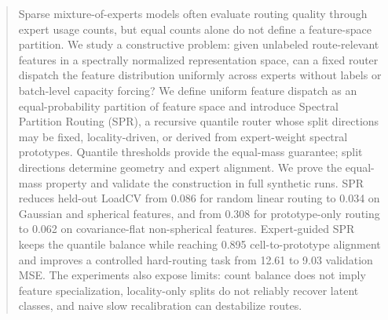 \begin{abstract}
Sparse mixture-of-experts models often evaluate routing quality through expert
usage counts, but equal counts alone do not define a feature-space partition. We
study a constructive problem: given unlabeled route-relevant features in a
spectrally normalized representation space, can a fixed router dispatch the
feature distribution uniformly across experts without labels or batch-level
capacity forcing? We define uniform feature dispatch as an equal-probability
partition of feature space and introduce Spectral Partition Routing (SPR), a
recursive quantile router whose split directions may be fixed, locality-driven,
or derived from expert-weight spectral prototypes. Quantile thresholds provide
the equal-mass guarantee; split directions determine geometry and expert
alignment. We prove the equal-mass property and validate the construction in
full synthetic runs. SPR reduces held-out LoadCV from 0.086 for random linear
routing to 0.034 on Gaussian and spherical features, and from 0.308 for
prototype-only routing to 0.062 on covariance-flat non-spherical features.
Expert-guided SPR keeps the quantile balance while reaching 0.895
cell-to-prototype alignment and improves a controlled hard-routing task from
12.61 to 9.03 validation MSE. The experiments also expose limits: count balance
does not imply feature specialization, locality-only splits do not reliably
recover latent classes, and naive slow recalibration can destabilize routes.
\end{abstract}
